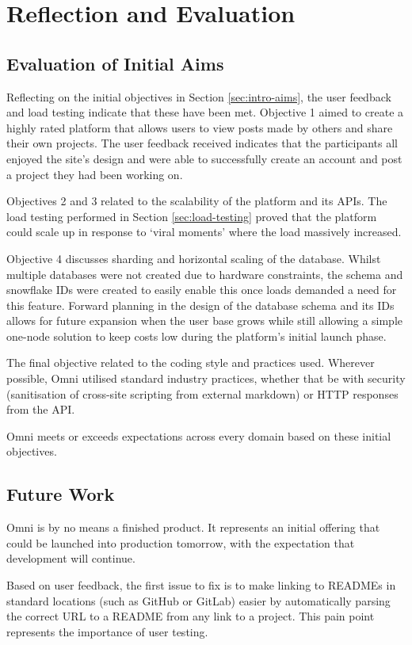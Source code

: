 \chapter{Reflection and Evaluation}
\label{cha:evaluation}

\section{Evaluation of Initial Aims}
Reflecting on the initial objectives in Section \ref{sec:intro-aims}, the user feedback and load testing indicate that these have been met.
Objective 1 aimed to create a highly rated platform that allows users to view posts made by others and share their own projects.
The user feedback received indicates that the participants all enjoyed the site's design and were able to successfully create an account and post a project they had been working on. 

Objectives 2 and 3 related to the scalability of the platform and its APIs.
The load testing performed in Section \ref{sec:load-testing} proved that the platform could scale up in response to `viral moments' where the load massively increased. 

Objective 4 discusses sharding and horizontal scaling of the database.
Whilst multiple databases were not created due to hardware constraints, the schema and snowflake IDs were created to easily enable this once loads demanded a need for this feature.
Forward planning in the design of the database schema and its IDs allows for future expansion when the user base grows while still allowing a simple one-node solution to keep costs low during the platform's initial launch phase. 

The final objective related to the coding style and practices used.
Wherever possible, Omni utilised standard industry practices, whether that be with security (sanitisation of cross-site scripting from external markdown) or HTTP responses from the API. 

Omni meets or exceeds expectations across every domain based on these initial objectives.

\section{Future Work}
Omni is by no means a finished product. It represents an initial offering that could be launched into production tomorrow, with the expectation that development will continue. 

Based on user feedback, the first issue to fix is to make linking to READMEs in standard locations (such as GitHub or GitLab) easier by automatically parsing the correct URL to a README from any link to a project.
This pain point represents the importance of user testing. 

